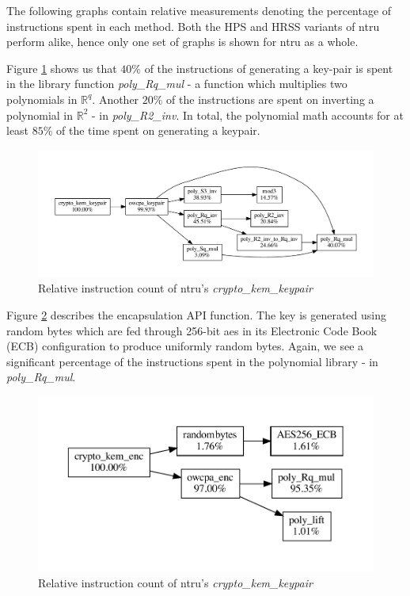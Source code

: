 The following graphs contain relative measurements denoting the percentage of instructions spent in each method. Both the HPS and HRSS variants of \gls{ntru} perform alike, hence only one set of graphs is shown for \gls{ntru} as a whole.

Figure \ref{figure:result:hot-paths:ntru:crypto_kem_keypair} shows us that $40\%$ of the instructions of generating a key-pair is spent in the library function \textit{poly\_Rq\_mul} - a function which multiplies two polynomials in $\mathbb{R}^q$. Another $20\%$ of the instructions are spent on inverting a polynomial in $\mathbb{R}^2$ - in \textit{poly\_R2\_inv}. In total, the polynomial math accounts for at least $85\%$ of the time spent on generating a keypair.

\begin{figure}[H]
    \centering
    \includegraphics[scale=0.5]{chapters/results/hot-paths/ntru/crypto_kem_keypair.pdf}
    \caption{Relative instruction count of \gls{ntru}'s \textit{crypto\_kem\_keypair}}
    \label{figure:result:hot-paths:ntru:crypto_kem_keypair}
\end{figure}

Figure \ref{figure:result:hot-paths:ntru:crypto_kem_enc} describes the encapsulation API function. The key is generated using random bytes which are fed through 256-bit \gls{aes} in its Electronic Code Book (ECB) configuration to produce uniformly random bytes. Again, we see a significant percentage of the instructions spent in the polynomial library - in \textit{poly\_Rq\_mul}.

\begin{figure}[H]
    \centering
    \includegraphics[scale=0.5]{chapters/results/hot-paths/ntru/crypto_kem_enc.pdf}
    \caption{Relative instruction count of \gls{ntru}'s \textit{crypto\_kem\_keypair}}
    \label{figure:result:hot-paths:ntru:crypto_kem_enc}
\end{figure}

